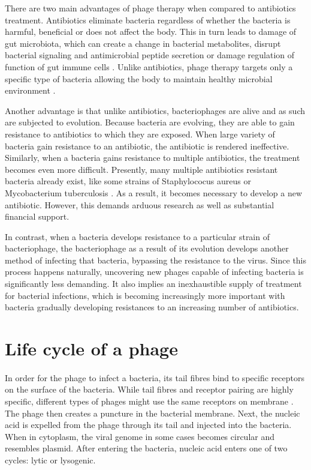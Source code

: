 There are two main advantages of phage therapy \cite{lin2017phage} when compared to antibiotics treatment. Antibiotics eliminate bacteria regardless of whether the bacteria is harmful, beneficial or does not affect the body. This in turn leads to damage of gut microbiota, which can create a change in bacterial metabolites, disrupt bacterial signaling and antimicrobial peptide secretion or damage regulation of function of gut immune cells \cite{zhang2019facing}. Unlike antibiotics, phage therapy targets only a specific type of bacteria allowing the body to maintain healthy microbial environment \cite{lin2017phage}. 

Another advantage is that unlike antibiotics, bacteriophages are alive and as such are subjected to evolution. Because bacteria are evolving, they are able to gain resistance to antibiotics to which they are exposed. When large variety of bacteria gain resistance to an antibiotic, the antibiotic is rendered ineffective. Similarly, when a bacteria gains resistance to multiple antibiotics, the treatment becomes even more difficult. Presently, many multiple antibiotics resistant bacteria already exist, like some strains of Staphylococus aureus or Mycobacterium tuberculosis \cite{guilfoile2007antibiotic}. As a result, it becomes necessary to develop a new antibiotic. However, this demands arduous research as well as substantial financial support. 

In contrast, when a bacteria develops resistance to a particular strain of bacteriophage, the bacteriophage as a result of its evolution develops another method of infecting that bacteria, bypassing the resistance to the virus. Since this process happens naturally, uncovering new phages capable of infecting bacteria is significantly less demanding. It also implies an inexhaustible supply of treatment for bacterial infections, which is becoming increasingly more important with bacteria gradually developing resistances to an increasing number of antibiotics.

\section{Life cycle of a phage}
\paragraph*{}
In order for the phage to infect a bacteria, its tail fibres bind to specific receptors on the surface of the bacteria. While tail fibres and receptor pairing are highly specific, different types of phages might use the same receptors on membrane \cite{guttman2005basic}. The phage then creates a puncture in the bacterial membrane. Next, the nucleic acid is expelled from the phage through its tail and injected into the bacteria. When in cytoplasm, the viral genome in some cases becomes circular and resembles plasmid. After entering the bacteria, nucleic acid enters one of two cycles: lytic or lysogenic.

